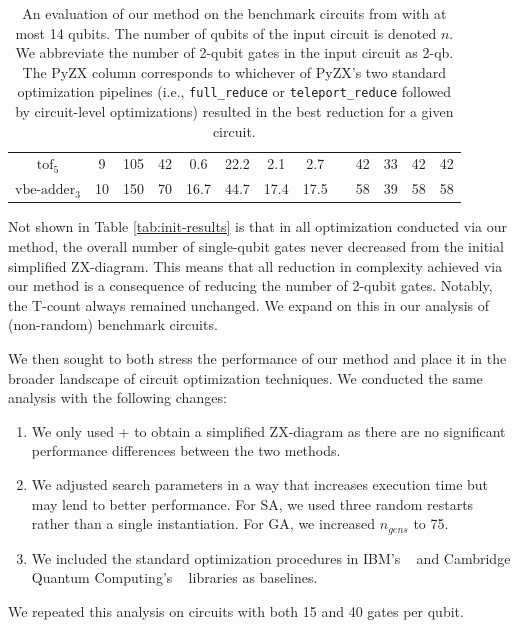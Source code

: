 \begin{table}[t]
\begin{tabular}{@{}ccccccccccccc@{}}
$\text{tof}_5$               & 9  & 105  & 42  & 0.6  & 22.2  & 2.1  & 2.7  &  & 42  & 33  & 42  & 42  \\
$\text{vbe-adder}_3$         & 10 & 150  & 70  & 16.7 & 44.7  & 17.4 & 17.5  &  & 58  & 39  & 58  & 58  \\ \bottomrule
\end{tabular}
\caption{\label{tab:bench}
  An evaluation of our method on the benchmark circuits from \cite{kissinger2019reducing} with at most 14 qubits.
  The number of qubits of the input circuit is denoted $n$.
  We abbreviate the number of 2-qubit gates in the input circuit as 2-qb.
  The PyZX column corresponds to whichever of PyZX's two standard optimization pipelines (i.e., {\color{gray}\texttt{full\_reduce}} or {\color{gray}\texttt{teleport\_reduce}} followed by circuit-level optimizations) resulted in the best reduction for a given circuit.
}
\end{table}



Not shown in Table \ref{tab:init-results} is that in all optimization conducted via our method, the overall number of single-qubit gates never decreased from the initial simplified ZX-diagram.
This means that all reduction in complexity achieved via our method is a consequence of reducing the number of 2-qubit gates.
Notably, the T-count always remained unchanged.
We expand on this in our analysis of (non-random) benchmark circuits.


We then sought to both stress the performance of our method and place it in the broader landscape of circuit optimization techniques.
We conducted the same analysis with the following changes:
\begin{enumerate}
\item
  We only used  +  to obtain a simplified ZX-diagram as there are no significant performance differences between the two methods.
\item
  We adjusted search parameters in a way that increases execution time but may lend to better performance.
  For SA, we used three random restarts rather than a single instantiation.
  For GA, we increased $n_{gens}$ to 75.
\item
  We included the standard optimization procedures in IBM's ~\cite{Qiskit} and Cambridge Quantum Computing's ~\cite{sivarajah2020t} libraries as baselines.
\end{enumerate}
We repeated this analysis on circuits with both 15 and 40 gates per qubit.

